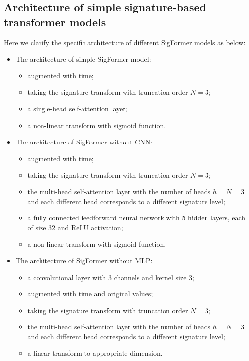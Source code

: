 \documentclass[]{article}
\renewcommand{\(}{\left(}
\renewcommand{\)}{\right)}
\begin{document}
	\subsection{Architecture of simple signature-based transformer models}
	\label{subapdix-architecture-simplesignature}
	Here we clarify the specific architecture of different SigFormer models as below:
	\begin{itemize}
		\item The architecture of simple SigFormer model:
		\begin{itemize}
			\item[-] augmented with time;
			\item[-] taking the signature transform with truncation order $N=3$;
			\item[-] a single-head self-attention layer;
			\item[-] a non-linear transform with sigmoid function.
		\end{itemize}
		\item The architecture of SigFormer without CNN:
		\begin{itemize}
			\item[-] augmented with time;
			\item[-] taking the signature transform with truncation order $N=3$;
			\item[-] the multi-head self-attention layer with the number of heads $h=N=3$ and each different head corresponds to a different signature level;
			\item[-] a fully connected feedforward neural network with 5 hidden layers, each of size 32 and ReLU activation;			
			\item[-] a non-linear transform with sigmoid function.			
		\end{itemize}
		\item The architecture of SigFormer without MLP:
		\begin{itemize}
			\item[-] a convolutional layer with 3 channels and kernel size 3;
			\item[-] augmented with time and original values;
			\item[-] taking the signature transform with truncation order $N=3$;
			\item[-] the multi-head self-attention layer with the number of heads $h=N=3$ and each different head corresponds to a different signature level;
			\item[-] a linear transform to appropriate dimension.
		\end{itemize}

\end{itemize}
\end{document}
